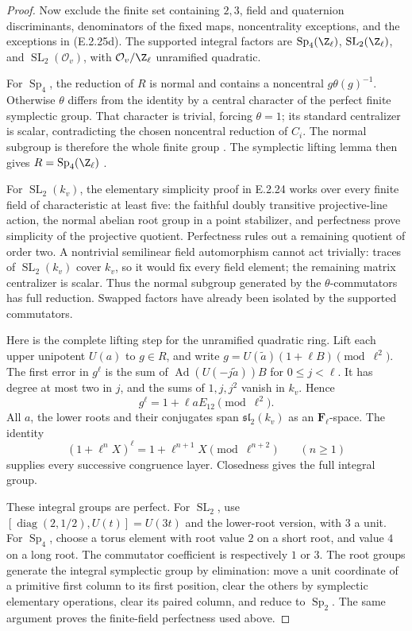 \begin{proof}
Now exclude the finite set containing \(2,3\),
field and quaternion discriminants, denominators
of the fixed maps, noncentrality exceptions, and
the exceptions in (E.2.25d). The supported integral
factors are
\(\operatorname{Sp}_4(\Z_\ell)\),
\(\operatorname{SL}_2(\Z_\ell)\), and
\(\operatorname{SL}_2(\mathcal O_v)\), with
\(\mathcal O_v/\Z_\ell\) unramified quadratic.

For \(\operatorname{Sp}_4\), the reduction of
\(R\) is normal and contains a noncentral
\(g\theta(g)^{-1}\). Otherwise \(\theta\) differs
from the identity by a central character of the
perfect finite symplectic group. That character
is trivial, forcing \(\theta=1\); its standard
centralizer is scalar, contradicting the chosen
noncentral reduction of \(C_i\). The normal
subgroup is therefore the whole finite group
\cite[Lemma 2.3(4), p.~6]{GenMayleWang2024}.
The symplectic lifting lemma then gives
\(R=\operatorname{Sp}_4(\Z_\ell)\)
\cite[Lemma 2.4, p.~6]{GenLombardoSurfaces2015}.

For \(\operatorname{SL}_2(k_v)\), the elementary
simplicity proof in E.2.24 works over every finite
field of characteristic at least five: the faithful
doubly transitive projective-line action, the normal
abelian root group in a point stabilizer, and
perfectness prove simplicity of the projective
quotient. Perfectness rules out a remaining
quotient of order two. A nontrivial semilinear
field automorphism cannot act trivially: traces
of \(\operatorname{SL}_2(k_v)\) cover \(k_v\),
so it would fix every field element; the remaining
matrix centralizer is scalar. Thus the normal
subgroup generated by the \(\theta\)-commutators
has full reduction. Swapped factors have already
been isolated by the supported commutators.

Here is the complete lifting step for the unramified
quadratic ring. Lift each upper unipotent \(U(a)\)
to \(g\in R\), and write
\(g=U(\widetilde a)(1+\ell B)\pmod{\ell^2}\).
The first error in \(g^\ell\) is the sum of
\(\operatorname{Ad}(U(-j\widetilde a))B\) for
\(0\leq j<\ell\). It has degree at most two in
\(j\), and the sums of \(1,j,j^2\) vanish in
\(k_v\). Hence
\[
 g^\ell=1+\ell aE_{12}\pmod{\ell^2}.
\]
All \(a\), the lower roots and their conjugates
span \(\mathfrak{sl}_2(k_v)\) as an
\(\mathbf F_\ell\)-space. The identity
\[
 (1+\ell^nX)^\ell
       =1+\ell^{n+1}X\pmod{\ell^{n+2}}
            \qquad(n\geq1)
\]
supplies every successive congruence layer.
Closedness gives the full integral group.

These integral groups are perfect. For
\(\operatorname{SL}_2\), use
\([
\operatorname{diag}(2,1/2),U(t)]=U(3t)\)
and the lower-root version, with \(3\) a unit.
For \(\operatorname{Sp}_4\), choose a torus
element with root value \(2\) on a short root,
and value \(4\) on a long root. The commutator
coefficient is respectively \(1\) or \(3\).
The root groups generate the integral symplectic
group by elimination: move a unit coordinate of
a primitive first column to its first position,
clear the others by symplectic elementary operations,
clear its paired column, and reduce to
\(\operatorname{Sp}_2\). The same argument proves
the finite-field perfectness used above.


\end{proof}
